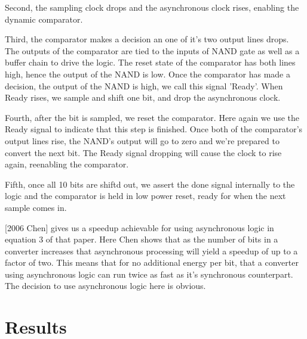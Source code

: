 \documentclass[10pt,journal]{IEEEtran}\usepackage{longtable}
\begin{document}
Second, the sampling clock drops and the asynchronous clock rises, enabling the dynamic comparator.

Third, the comparator makes a decision an one of it's two output lines drops. 
The outputs of the comparator are tied to the inputs of NAND gate as well as a buffer chain to drive the logic.
The reset state of the comparator has both lines high, hence the output of the NAND is low.
Once the comparator has made a decision, the output of the NAND is high, we call this signal 'Ready'. When Ready rises, we sample and shift one bit, and drop the asynchronous clock.

Fourth, after the bit is sampled, we reset the comparator. Here again we use the Ready signal to indicate that this step is finished. Once both of the comparator's output lines rise, the NAND's output will go to zero and we're prepared to convert the next bit. The Ready signal dropping will cause the clock to rise again, reenabling the comparator.

Fifth, once all 10 bits are shiftd out, we assert the done signal internally to the logic and the comparator is held in low power reset, ready for when the next sample comes in.

[2006 Chen] gives us a speedup achievable for using asynchronous logic in equation 3 of that paper. Here Chen shows that as the number of bits in a converter increases that asynchronous processing will yield a speedup of up to a factor of two.
This means that for no additional energy per bit, that a converter using asynchronous logic can run twice as fast as it's synchronous counterpart. The decision to use asynchronous logic here is obvious.



\section{Results}
\end{document}
